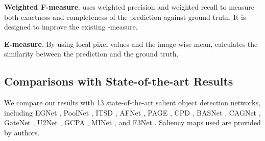 \documentclass[10pt,twocolumn,letterpaper]{article}
\begin{document}
\textbf{Weighted F-measure}.  uses weighted precision and weighted recall to measure both exactness and completeness of the prediction against ground truth. It is designed to improve the existing -measure.

\textbf{E-measure}. By using local pixel values and the image-wise mean,  calculates the similarity between the prediction and the ground truth.

\subsection{Comparisons with State-of-the-art Results}
\label{compare}
We compare our results with 13 state-of-the-art salient object detection networks, including EGNet \cite{EGNET}, PoolNet \cite{POOLNET}, ITSD \cite{ITSD}, AFNet \cite{AFNET}, PAGE \cite{PAGE}, CPD \cite{CPD}, BASNet \cite{BASNET}, CAGNet \cite{CAGNET}, GateNet \cite{GATENET}, U2Net \cite{U2NET}, GCPA \cite{GCPA}, MINet \cite{MINET}, and F3Net \cite{F3NET}. Saliency maps used are provided by authors.
\end{document}
